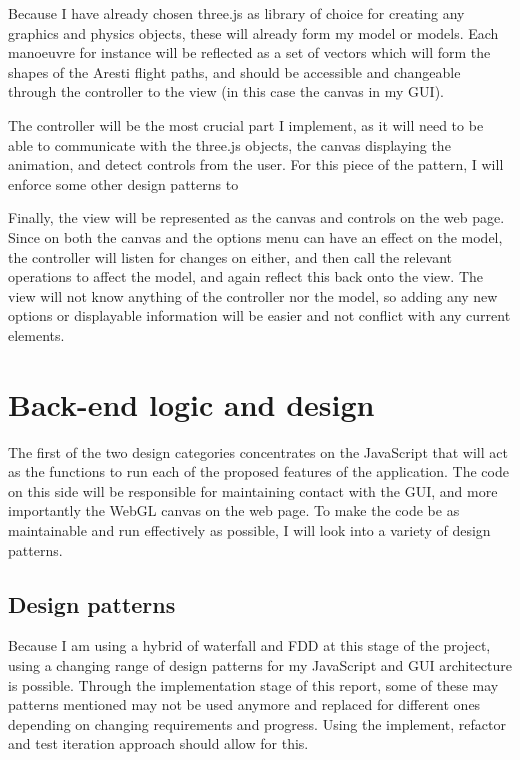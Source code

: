 Because I have already chosen three.js as library of choice for creating any graphics and physics objects, these will already form my model or models. Each manoeuvre for instance will be reflected as a set of vectors which will form the shapes of the Aresti flight paths, and should be accessible and changeable through the controller to the view (in this case the canvas in my GUI).

The controller will be the most crucial part I implement, as it will need to be able to communicate with the three.js objects, the canvas displaying the animation, and detect controls from the user. For this piece of the pattern, I will enforce some other design patterns to 

Finally, the view will be represented as the canvas and controls on the web page. Since on both the canvas and the options menu can have an effect on the model, the controller will listen for changes on either, and then call the relevant operations to affect the model, and again reflect this back onto the view. The view will not know anything of the controller nor the model, so adding any new options or displayable information will be easier and not conflict with any current elements.

\section{Back-end logic and design}
The first of the two design categories concentrates on the JavaScript that will act as the functions to run each of the proposed features of the application. The code on this side will be responsible for maintaining contact with the GUI, and more importantly the WebGL canvas on the web page. To make the code be as maintainable and run effectively as possible, I will look into a variety of design patterns.

\subsection{Design patterns}
Because I am using a hybrid of waterfall and FDD at this stage of the project, using a changing range of design patterns for my JavaScript and GUI architecture is possible. Through the implementation stage of this report, some of these may patterns mentioned may not be used anymore and replaced for different ones depending on changing requirements and progress. Using the implement, refactor and test iteration approach should allow for this.

